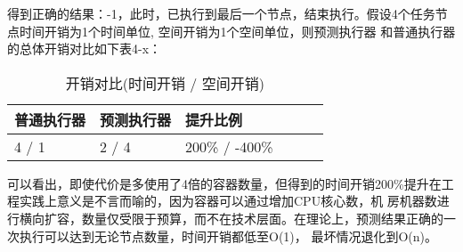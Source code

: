 得到正确的结果：-1，此时，已执行到最后一个节点，结束执行。假设4个任务节点时间开销为1个时间单位, 空间开销为1个空间单位，则预测执行器
和普通执行器的总体开销对比如下表4-x：

\begin{table}[H]
    \centering
    \caption{开销对比(时间开销 / 空间开销)}
    \label{tab:cost}
    \begin{tabular}{llllll}
        \toprule
        普通执行器 & 预测执行器 & 提升比例 \\
        \midrule
        4 / 1   &2 / 4   &200\% / -400\% \\
        \bottomrule
    \end{tabular}
\end{table}

可以看出，即使代价是多使用了4倍的容器数量，但得到的时间开销200\%提升在工程实践上意义是不言而喻的，因为容器可以通过增加CPU核心数，机
房机器数进行横向扩容，数量仅受限于预算，而不在技术层面。在理论上，预测结果正确的一次执行可以达到无论节点数量，时间开销都低至O(1)，
最坏情况退化到O(n)。

%


